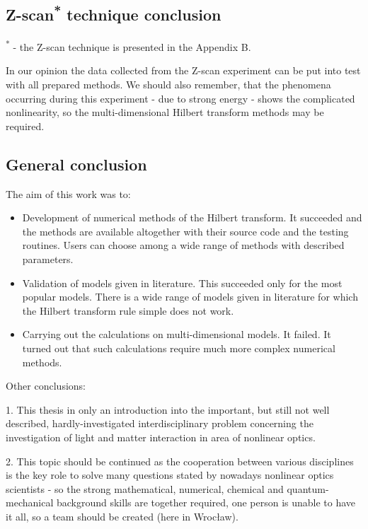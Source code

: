 \documentclass[12pt,twoside,a4paper]{article}
\numberwithin{equation}{subsection}
\numberwithin{figure}{subsection}
\begin{document}
\subsection{Z-scan\textsuperscript{*} technique conclusion} \label{chap:conclusion_zscan}


\textsuperscript{*} - the Z-scan technique is presented in the Appendix B. 

In our opinion the data collected from the Z-scan experiment can be put into test with all prepared methods. We should also remember, that the phenomena occurring during this experiment - due to strong energy - shows the complicated nonlinearity, so the multi-dimensional Hilbert transform methods may be required. 

\subsection{General conclusion} \label{chap:conclusion_general}

The aim of this work was to:

\begin{itemize} 
	\item Development of numerical methods of the Hilbert transform. It succeeded and the methods are available altogether with their source code and the testing routines. Users can choose among a wide range of methods with described parameters.
	\item Validation of models given in literature. This succeeded only for the most popular models. There is a wide range of models given in literature for which the Hilbert transform rule simple does not work.
	\item Carrying out the calculations on multi-dimensional models. It failed. It turned out that such calculations require much more complex numerical methods.
\end{itemize}

Other conclusions:

1. This thesis in only an introduction into the important, but still not well described, hardly-investigated interdisciplinary problem concerning the investigation of light and matter interaction in area of nonlinear optics. 

2. This topic should be continued as the cooperation between various disciplines is the key role to solve many questions stated by nowadays nonlinear optics scientists - so the strong mathematical, numerical, chemical and quantum-mechanical background skills are together required, one person is unable to have it all, so a team should be created (here in Wrocław).
\end{document}
